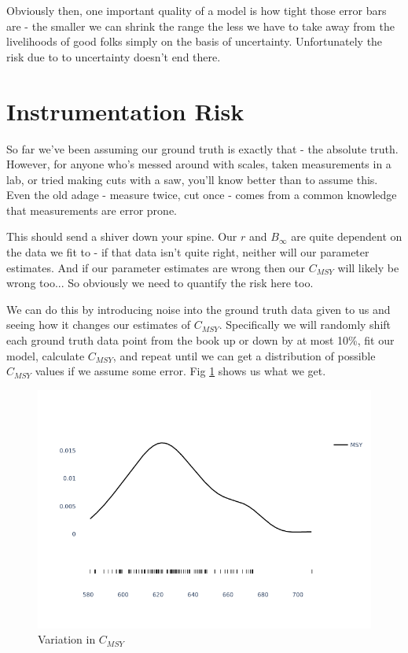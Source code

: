 \documentclass[11pt,a5paper]{book}
\begin{document}
Obviously then, one important quality of a model is how tight those error bars are - the smaller we can shrink the range the less we have to take away from the livelihoods of good folks simply on the basis of uncertainty. Unfortunately the risk due to to uncertainty doesn't end there. 

\section{Instrumentation Risk}

So far we've been assuming our ground truth is exactly that - the absolute truth. However, for anyone who's messed around with scales, taken measurements in a lab, or tried making cuts with a saw, you'll know better than to assume this. Even the old adage - measure twice, cut once - comes from a common knowledge that measurements are error prone. 
\newline

This should send a shiver down your spine. Our $r$ and $B_\infty$ are quite dependent on the data we fit to - if that data isn't quite right, neither will our parameter estimates. And if our parameter estimates are wrong then our $C_{MSY}$ will likely be wrong too... So obviously we need to quantify the risk here too. 
\newline

We can do this by introducing noise into the ground truth data given to us and seeing how it changes our estimates of $C_{MSY}$. Specifically we will randomly shift each ground truth data point from the book up or down by at most 10\%, fit our model, calculate $C_{MSY}$, and repeat until we can get a distribution of possible $C_{MSY}$ values if we assume some error. Fig \ref{fig:instrumentation_error} shows us what we get.
\newline

\begin{figure}[h!] 
  \includegraphics[width=\linewidth]{notebooks/SurplusModels/instrumentation.png}
  \caption{Variation in $C_{MSY}$}
  \label{fig:instrumentation_error}
\end{figure}
\end{document}

